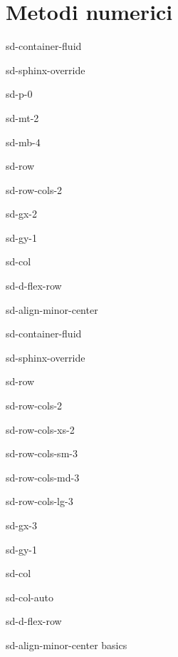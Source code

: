 \documentclass[letterpaper,10pt,italian]{jupyterBook}
\begin{document}
\part{Metodi numerici}

\sphinxstepscope

\begin{sphinxuseclass}{sd-container-fluid}
\begin{sphinxuseclass}{sd-sphinx-override}
\begin{sphinxuseclass}{sd-p-0}
\begin{sphinxuseclass}{sd-mt-2}
\begin{sphinxuseclass}{sd-mb-4}
\begin{sphinxuseclass}{sd-row}
\begin{sphinxuseclass}{sd-row-cols-2}
\begin{sphinxuseclass}{sd-gx-2}
\begin{sphinxuseclass}{sd-gy-1}
\begin{sphinxuseclass}{sd-col}
\begin{sphinxuseclass}{sd-d-flex-row}
\begin{sphinxuseclass}{sd-align-minor-center}
\begin{sphinxuseclass}{sd-container-fluid}
\begin{sphinxuseclass}{sd-sphinx-override}
\begin{sphinxuseclass}{sd-row}
\begin{sphinxuseclass}{sd-row-cols-2}
\begin{sphinxuseclass}{sd-row-cols-xs-2}
\begin{sphinxuseclass}{sd-row-cols-sm-3}
\begin{sphinxuseclass}{sd-row-cols-md-3}
\begin{sphinxuseclass}{sd-row-cols-lg-3}
\begin{sphinxuseclass}{sd-gx-3}
\begin{sphinxuseclass}{sd-gy-1}
\begin{sphinxuseclass}{sd-col}
\begin{sphinxuseclass}{sd-col-auto}
\begin{sphinxuseclass}{sd-d-flex-row}
\begin{sphinxuseclass}{sd-align-minor-center}
\sphinxAtStartPar
basics


\end{sphinxuseclass}
\end{sphinxuseclass}
\end{sphinxuseclass}
\end{sphinxuseclass}
\end{sphinxuseclass}
\end{sphinxuseclass}
\end{sphinxuseclass}
\end{sphinxuseclass}
\end{sphinxuseclass}
\end{sphinxuseclass}
\end{sphinxuseclass}
\end{sphinxuseclass}
\end{sphinxuseclass}
\end{sphinxuseclass}
\end{sphinxuseclass}
\end{sphinxuseclass}
\end{sphinxuseclass}
\end{sphinxuseclass}
\end{sphinxuseclass}
\end{sphinxuseclass}
\end{sphinxuseclass}
\end{sphinxuseclass}
\end{sphinxuseclass}
\end{sphinxuseclass}
\end{sphinxuseclass}
\end{sphinxuseclass}
\end{document}
